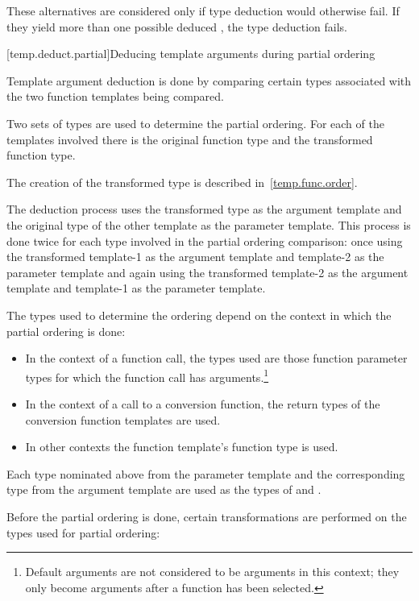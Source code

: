 \pnum
These alternatives are considered only if type deduction would
otherwise fail.
If they yield more than one possible deduced
,
the type deduction fails.

[temp.deduct.partial]{Deducing template arguments during partial ordering}

\pnum
Template argument deduction is done by comparing certain types associated with
the two function templates being compared.

\pnum
Two sets of types are used to determine the partial ordering.  For each of
the templates involved there is the original function type and the
transformed function type.
\begin{note}
The creation of the transformed type is described in~\ref{temp.func.order}.
\end{note}
The deduction process uses the
transformed type as the argument template and the original type of the
other template as the parameter template.  This process is done twice
for each type involved in the partial ordering comparison: once using
the transformed template-1 as the argument template and template-2 as
the parameter template and again using the transformed template-2 as
the argument template and template-1 as the parameter template.

\pnum
The types used to determine the ordering depend on the context in which
the partial ordering is done:

\begin{itemize}
\item
In the context of a function call, the types used are those function parameter types
for which the function call has arguments.\footnote{Default arguments
are not considered to be arguments in this context; they only become arguments
after a function has been selected.}
\item
In the context of a call to a conversion function, the return types of
the conversion function templates are used.
\item
In other contexts the function template's function
type is used.
\end{itemize}

\pnum
Each type nominated above from the parameter template and the corresponding type from the
argument template are used as the types of
and
.

\pnum
Before the partial ordering is done, certain transformations are performed
on the types used for partial ordering:

